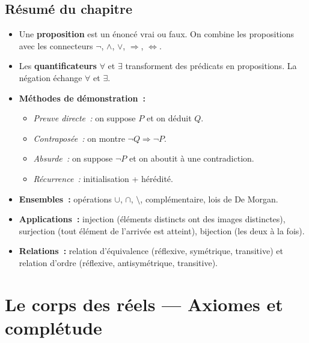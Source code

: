 \documentclass[12pt,a4paper,openany]{book}
\theoremstyle{definition}
\begin{document}
\section*{Résumé du chapitre}

\begin{resumchapitre}
  \begin{itemize}
    \item Une \textbf{proposition} est un énoncé vrai ou faux. On combine les propositions avec les connecteurs $\lnot$, $\land$, $\lor$, $\Rightarrow$, $\Leftrightarrow$.
    \item Les \textbf{quantificateurs} $\forall$ et $\exists$ transforment des prédicats en propositions. La négation échange $\forall$ et $\exists$.
    \item \textbf{Méthodes de démonstration~:}
      \begin{itemize}
        \item \emph{Preuve directe~:} on suppose $P$ et on déduit $Q$.
        \item \emph{Contraposée~:} on montre $\lnot Q \Rightarrow \lnot P$.
        \item \emph{Absurde~:} on suppose $\lnot P$ et on aboutit à une contradiction.
        \item \emph{Récurrence~:} initialisation + hérédité.
      \end{itemize}
    \item \textbf{Ensembles~:} opérations $\cup$, $\cap$, $\setminus$, complémentaire, lois de De Morgan.
    \item \textbf{Applications~:} injection (éléments distincts ont des images distinctes), surjection (tout élément de l'arrivée est atteint), bijection (les deux à la fois).
    \item \textbf{Relations~:} relation d'équivalence (réflexive, symétrique, transitive) et relation d'ordre (réflexive, antisymétrique, transitive).
  \end{itemize}
\end{resumchapitre}


\chapter{Le corps des réels --- Axiomes et complétude}
\label{chap:reels}
\end{document}

